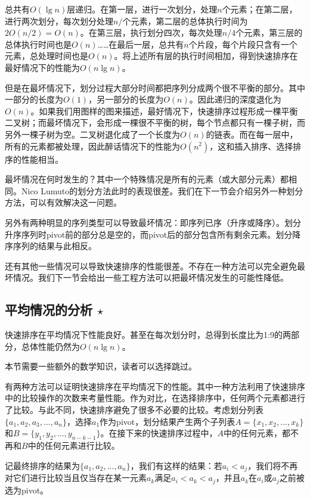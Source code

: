 \documentclass[UTF8]{article}
\begin{document}
总共有$O(\lg n)$层递归。在第一层，进行一次划分，处理$n$个元素；在第二层，进行两次划分，每次划分处理$n/$个元素，第二层的总体执行时间为$2 O(n/2) = O(n)$。在第三层，执行划分四次，每次处理$n/4$个元素，第三层的总体执行时间也是$O(n)$……在最后一层，总共有$n$个片段，每个片段只含有一个元素，总处理时间也是$O(n)$。将上述所有层的执行时间相加，得到快速排序在最好情况下的性能为$O(n \lg n)$。

但是在最坏情况下，划分过程大部分时间都把序列分成两个很不平衡的部分。其中一部分的长度为$O(1)$，另一部分的长度为$O(n)$。因此递归的深度退化为$O(n)$。如果我们用图样的图来描述，最好情况下，快速排序过程形成一棵平衡二叉树；而最坏情况下，会形成一棵很不平衡的树，每个节点都只有一棵子树，而另外一棵子树为空。二叉树退化成了一个长度为$O(n)$的链表。而在每一层中，所有的元素都被处理，因此醉话情况下的性能为$O(n^2)$，这和插入排序、选择排序的性能相当。

最坏情况在何时发生的？其中一个特殊情况是所有的元素（或大部分元素）都相同。Nico Lumuto的划分方法此时的表现很差。我们在下一节会介绍另外一种划分方法，可以有效解决这一问题。

另外有两种明显的序列类型可以导致最坏情况：即序列已序（升序或降序）。划分升序序列时pivot前的部分总是空的，而pivot后的部分包含所有剩余元素。划分降序序列的结果与此相反。

还有其他一些情况可以导致快速排序的性能很差。不存在一种方法可以完全避免最坏情况。我们下一节会给出一些工程方法可以把最坏情况发生的可能性降低。

\subsection{平均情况的分析 $\star$}

快速排序在平均情况下性能良好。甚至在每次划分时，总得到长度比为1:9的两部分，总体性能仍然为$O(n \lg n)$\cite{CLRS}。

本节需要一些额外的数学知识，读者可以选择跳过。

有两种方法可以证明快速排序在平均情况下的性能。其中一种方法利用了快速排序中的比较操作的次数来考量性能\cite{CLRS}。作为对比，在选择排序中，任何两个元素都进行了比较。与此不同，快速排序避免了很多不必要的比较。考虑划分列表$\{ a_1, a_2, a_3, ..., a_n\}$，选择$a_1$作为pivot，划分结果产生两个子列表$A = \{x_1, x_2, ..., x_k\}$和$B = \{ y_1, y_2, ..., y_{n-k-1} \}$。在接下来的快速排序过程中，$A$中的任何元素，都不再和$B$中的任何元素进行比较。

记最终排序的结果为$\{ a_1, a_2, ..., a_n \}$，我们有这样的结果：若$a_i < a_j$，我们将不再对它们进行比较当且仅当存在某一元素$a_k$满足$a_i < a_k < a_j$，并且$a_k$在$a_i$或$a_j$之前被选为pivot。
\end{document}
